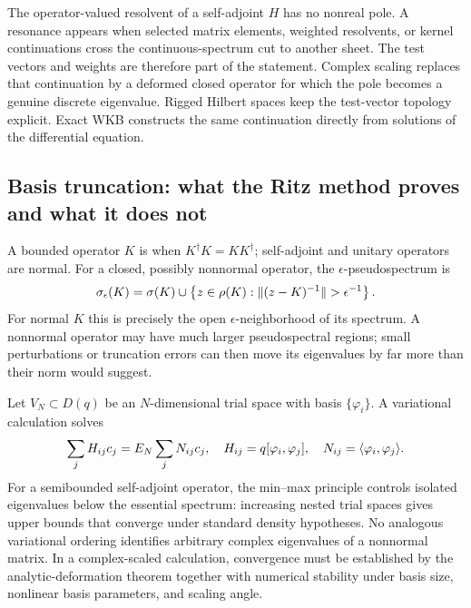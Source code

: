 The operator-valued resolvent of a self-adjoint $H$ has no nonreal pole.  A
resonance appears when selected matrix elements, weighted resolvents, or
kernel continuations cross the continuous-spectrum cut to another sheet.
The test vectors and weights are therefore part of the statement.  Complex
scaling replaces that continuation by a deformed closed operator for which
the pole becomes a genuine discrete eigenvalue.  Rigged Hilbert spaces keep
the test-vector topology explicit.  Exact WKB constructs the same
continuation directly from solutions of the differential equation.

\subsection{Basis truncation: what the Ritz method proves and what it does not}
\label{subsec:basis-truncation}

A bounded operator $K$ is  when
$K^\dagger K=KK^\dagger$; self-adjoint and unitary operators are normal.
For a closed, possibly nonnormal operator, the $\epsilon$-pseudospectrum is
\begin{equation}
  \pseudospectrum(K)
  =\spectrum(K)\cup
   \left\{z\in\resolventset(K):\|(z-K)^{-1}\|>\epsilon^{-1}\right\}.
  \label{eq:pseudospectrum-definition}
\end{equation}
For normal $K$ this is precisely the open $\epsilon$-neighborhood of its
spectrum.  A nonnormal operator may have much larger pseudospectral regions;
small perturbations or truncation errors can then move its eigenvalues by far
more than their norm would suggest.

Let $V_N\subset D(q)$ be an $N$-dimensional trial space with basis
$\{\varphi_i\}$.  A variational calculation solves
\begin{equation}
  \sum_j H_{ij}c_j=E_N\sum_jN_{ij}c_j,
  \quad
  H_{ij}=q[\varphi_i,\varphi_j],
  \quad
  N_{ij}=\langle \varphi_i,\varphi_j\rangle.
  \label{eq:generalized-ritz}
\end{equation}
For a semibounded self-adjoint operator, the min--max principle controls
isolated eigenvalues below the essential spectrum: increasing nested trial
spaces gives upper bounds that converge under standard density hypotheses.
No analogous variational ordering identifies arbitrary complex eigenvalues
of a nonnormal matrix.  In a complex-scaled calculation, convergence must be
established by the analytic-deformation theorem together with numerical
stability under basis size, nonlinear basis parameters, and scaling angle.

